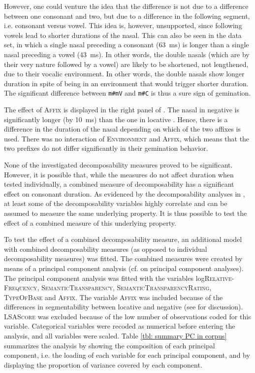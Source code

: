 However, one could venture the idea that the difference is not due to a difference between one consonant and two, but due to a difference in the following segment, i.e. consonant versus vowel. This idea is, however, unsupported, since following vowels lead to shorter durations of the nasal. This can also be seen in the data set, in which a single nasal preceding a consonant (63~ms) is longer than a single nasal preceding a vowel (43~ms). In other words, the double nasals (which are by their very nature followed by a vowel) are likely to be shortened, not lengthened, due to their vocalic environment. In other words, the double nasals show longer duration in spite of being in an environment that would trigger shorter duration. The significant difference between \texttt{m\#mV}  and \texttt{m\#C} is thus a sure sign of gemination.



The effect of \textsc{Affix} is displayed  in the right panel of . The nasal in negative  is significantly longer (by 10~ms) than the one in locative . Hence, there is a difference in the duration of the nasal depending on which of the two affixes is used. There was no interaction of \textsc{Environment} and \textsc{Affix}, which means that the two prefixes do not differ significantly in their gemination behavior.


None of the investigated decomposability measures proved to be significant. However, it is possible that, while the measures do not affect duration when tested individually, a combined measure of decomposability has a significant effect on consonant duration. As evidenced by the decomposability analyses in , at least some of the decomposability variables highly correlate and can be assumed to measure the same underlying property. It is thus possible to test the effect of a combined measure of this underlying property. 

To test the effect of a combined decomposability measure, an additional model with combined decomposability measures (as opposed to individual decomposability measures) was fitted. The combined measures were created by means of a principal component analysis (cf.  on principal component analyses). 
The principal component analysis was fitted with the variables log\textsc{Relative-Frequency}, \textsc{SemanticTransparency}, \textsc{SemanticTransparencyRating}, \textsc{TypeOfBase} and \textsc{Affix}. The variable \textsc{Affix} was included because of the differences in segmentability between locative and negative  (see  for discussion). \textsc{LSAScore} was excluded because of the low number of observations coded for this variable. Categorical variables were recoded as numerical before entering the analysis, and all variables were scaled.
Table \ref{tbl: summary PC in corpus} summarizes the analysis by showing the composition of each principal component, i.e. the loading of each variable for each principal component, and by displaying the proportion of variance covered by each component. 



